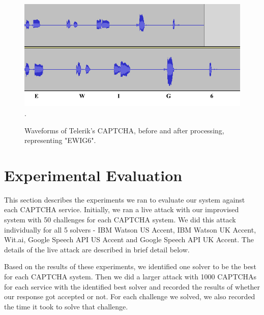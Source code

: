 \begin{figure}[t]
   \centering
   \includegraphics[width=\columnwidth]{figures/Telerik1.jpg}.
   \caption{Waveforms of Telerik's CAPTCHA, before and after processing, representing "EWIG6".}
   \label{fig:telerik1}
\end{figure}

\section{Experimental Evaluation}
\label{sec:evaluation}

This section describes the experiments we ran to evaluate our system against each CAPTCHA service. Initially, we ran a live attack with our improvised system with 50 challenges for each CAPTCHA system. We did this attack individually for all 5 solvers - IBM Watson US Accent, IBM Watson UK Accent, Wit.ai, Google Speech API US Accent and Google Speech API UK Accent. The details of the live attack are described in brief detail below.\newline

Based on the results of these experiments, we identified one solver to be the best for each CAPTCHA system. Then we did a larger attack with 1000 CAPTCHAs for each service with the identified best solver and recorded the results of whether our response got accepted or not. For each challenge we solved, we also recorded the time it took to solve that challenge. 

